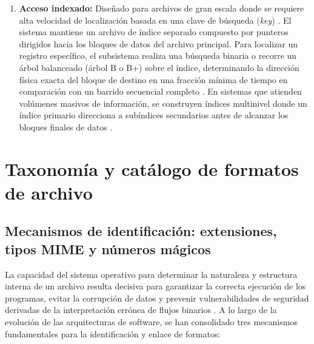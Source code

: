 \documentclass[12pt]{article}
\begin{document}
\begin{enumerate}[noitemsep, topsep=2pt]
    \item \textbf{Acceso indexado:} Diseñado para archivos de gran escala donde se requiere alta velocidad de localización basada en una clave de búsqueda (\textit{key}) \parencite[\S 12.2, pp.\ 558--560]{stallings2018operating}. El sistema mantiene un archivo de índice separado compuesto por punteros dirigidos hacia los bloques de datos del archivo principal. Para localizar un registro específico, el subsistema realiza una búsqueda binaria o recorre un árbol balanceado (árbol B o B+) sobre el índice, determinando la dirección física exacta del bloque de destino en una fracción mínima de tiempo en comparación con un barrido secuencial completo \parencite[\S 8, pp.\ 249--252]{mchoes2011sistemas}. En sistemas que atienden volúmenes masivos de información, se construyen índices multinivel donde un índice primario direcciona a subíndices secundarios antes de alcanzar los bloques finales de datos \parencite[\S 10.2.3, p.\ 339]{silberschatz2006fundamentos}.
\end{enumerate}

\section{Taxonomía y catálogo de formatos de archivo}
\label{sec:taxonomiaCatalogoFormatos}

\subsection{Mecanismos de identificación: extensiones, tipos MIME y números mágicos}
\label{subsec:mecanismosIdentificacionFormatos}

La capacidad del sistema operativo para determinar la naturaleza y estructura interna de un archivo resulta decisiva para garantizar la correcta ejecución de los programas, evitar la corrupción de datos y prevenir vulnerabilidades de seguridad derivadas de la interpretación errónea de flujos binarios \parencite[\S 10.1.3, p.\ 339]{silberschatz2006fundamentos}. A lo largo de la evolución de las arquitecturas de software, se han consolidado tres mecanismos fundamentales para la identificación y enlace de formatos:
\end{document}
